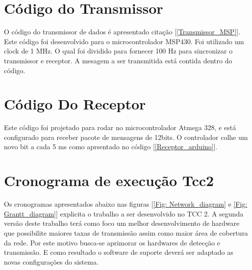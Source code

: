 \begin{apendicesenv}

\partapendices

\chapter{Código do Transmissor}


O código do transmissor de dados é apresentado citação [\ref{Transmissor_MSP}]. Este código foi desenvolvido para o microcontrolador MSP430. Foi utilizado um clock de 1 MHz. O qual foi dividido para fornecer 100 Hz para sincronizar o transmissor e receptor.
A mesagem a ser transmitida está contida dentro do código.







\chapter{Código Do Receptor}

Este código foi projetado para rodar no microcontrolador Atmega 328, e está configurado para receber pacote de mensagens de 12bits. O controlador colhe um novo bit a cada 5 ms como aprsentado no código [\ref{Receptor_arduino}]. 





\chapter{Cronograma de execução Tcc2}

Os cronogramas apresentados abaixo nas figuras [\ref{Fig: Network_diagram} e \ref{Fig: Grantt_diagram}] explicita o trabalho a ser desenvolvido no TCC 2. A segunda versão deste trabalho terá como foco um melhor desenvolvimento de hardware que possibilite maiores taxas de transmissão assim como maior área de cobertura da rede. Por este motivo busca-se aprimorar os hardwares de detecção e transmissão. E como resultado o software de suporte deverá ser adaptado as novas configurações do sistema.


\end{apendicesenv}
